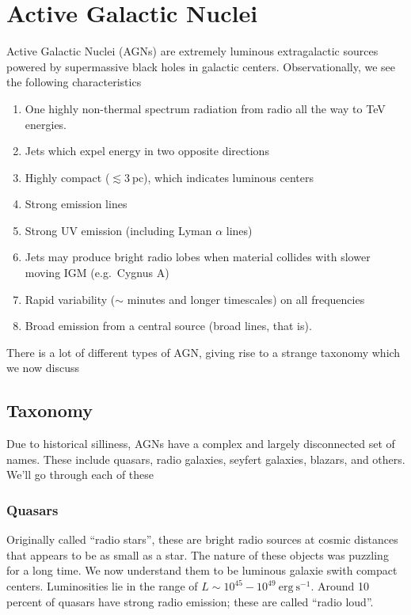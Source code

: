 \documentclass[10pt]{article}
\numberwithin{equation}{section}
\begin{document}
\section{Active Galactic Nuclei} %
\label{sec:active_galactic_nuclei}
Active Galactic Nuclei (AGNs) are extremely luminous extragalactic sources powered by supermassive black holes in galactic centers. Observationally, we see the following characteristics
	\begin{enumerate}
		\item One highly non-thermal spectrum radiation from radio all the way to TeV energies. 
		\item Jets which expel energy in two opposite directions
		\item Highly compact ($\lesssim 3\ \mathrm{pc}$), which indicates luminous centers
		\item Strong emission lines
		\item Strong UV emission (including Lyman $\alpha$ lines)
		\item Jets may produce bright radio lobes when material collides with slower moving IGM (e.g.\ Cygnus A)
		\item Rapid variability ($\sim$ minutes and longer timescales) on all frequencies
		\item Broad emission from a central source (broad lines, that is).
	\end{enumerate}
	There is a lot of different types of AGN, giving rise to a strange taxonomy which we now discuss
	\subsection{Taxonomy} %
	\label{sub:taxonomy}
	Due to historical silliness, AGNs have a complex and largely disconnected set of names. These include quasars, radio galaxies, seyfert galaxies, blazars, and others. We'll go through each of these
	\subsubsection{Quasars} %
	\label{ssub:quasars}
	Originally called ``radio stars'', these are bright radio sources at cosmic distances that appears to be as small as a star. The nature of these objects was puzzling for a long time. We now understand them to be luminous galaxie swith compact centers. Luminosities lie in the range of $L\sim 10^{45}-10^{49}\ \mathrm{erg\ s^{-1}}$. Around 10 percent of quasars have strong radio emission; these are called ``radio loud''.
\end{document}
